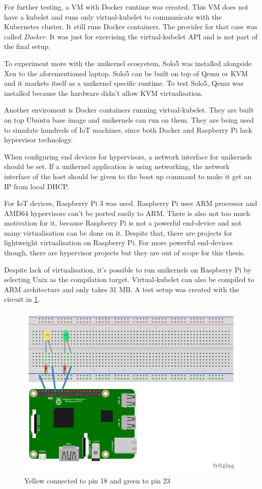 For further testing, a VM with Docker runtime was created. This VM does not have a kubelet and runs only virtual-kubelet to communicate with the Kubernetes cluster. It still runs Docker containers. The provider for that case was called \textit{Docker}. It was just for exercising the virtual-kubelet API and is not part of the final setup.

To experiment more with the unikernel ecosystem, Solo5 \cite{solo5} was installed alongside Xen to the aforementioned laptop. Solo5 can be built on top of Qemu or KVM and it markets itself as a unikernel specific runtime. To test Solo5, Qemu was installed because the hardware didn't allow KVM virtualisation.

Another enviroment is Docker containers running virtual-kubelet. They are built on top Ubuntu base image and unikernels can run on them. They are being used to simulate hundreds of IoT machines, since both Docker and Raspberry Pi lack hypervisor technology.

When configuring end devices for hypervisors, a network interface for unikernels should be set. If a unikernel application is using networking, the network interface of the host should be given to the boot up command to make it get an IP from local DHCP.


For IoT devices, Raspberry Pi 3 was used. Raspberry Pi uses ARM processor and AMD64 hypervisors can't be ported easily to ARM. There is also not too much motivation for it, because Raspberry Pi is not a powerful end-device and not many virtualisation can be done on it. Despite that, there are projects for lightweight virtualisation on Raspberry Pi. For more powerful end-devices though, there are hypervisor projects but they are out of scope for this thesis.

Despite lack of virtualisation, it's possible to run unikernels on Raspberry Pi by selecting Unix as the compilation target. Virtual-kubelet can also be compiled to ARM architecture and only takes 31 MB. A test setup was created with the circuit in \ref{fig:rpi-diagram}.

\begin{figure}[htpb]
  \centering
  \includegraphics[height=0.6\textwidth]{figures/rpi-diagram.pdf}
  \caption{Yellow connected to pin 18 and green to pin 23} \label{fig:rpi-diagram}
\end{figure}

